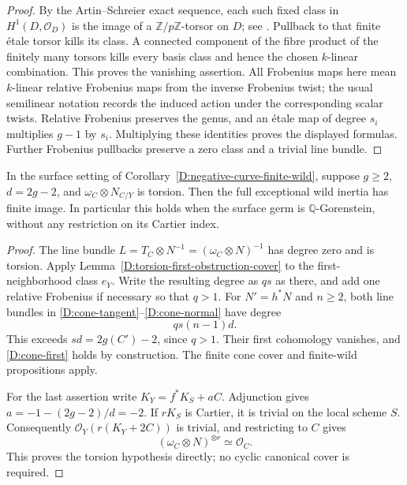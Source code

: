 \begin{proof}
By the Artin--Schreier exact sequence, each such fixed
class in $H^1(D,\mathcal O_D)$ is the image of a
$\mathbb Z/p\mathbb Z$-torsor on $D$; see
\cite[section 59.63, tag 0A3J]{StacksBFiniteCone}.
Pullback to that finite \'etale torsor kills its class.
A connected component of the fibre product of the
finitely many torsors kills every basis class and hence
the chosen $k$-linear combination.  This proves the
vanishing assertion.  All Frobenius maps here mean
$k$-linear relative Frobenius maps from the inverse
Frobenius twist; the usual semilinear notation records
the induced action under the corresponding scalar twists.
Relative Frobenius preserves the genus, and an \'etale
map of degree $s_i$ multiplies $g-1$ by $s_i$.
Multiplying these identities proves the displayed
formulas.  Further Frobenius pullbacks preserve a zero
class and a trivial line bundle.
\end{proof}

\begin{corollary}
\label{D:negative-curve-equality-finite-wild}
In the surface setting of
Corollary~\ref{D:negative-curve-finite-wild}, suppose $g\geq2$,
$d=2g-2$, and $\omega_C\otimes N_{C/Y}$ is torsion.
Then the full exceptional wild inertia has finite image.
In particular this holds when the surface germ is
$\mathbb Q$-Gorenstein, without any restriction on its
Cartier index.
\end{corollary}

\begin{proof}
The line bundle
$L=T_C\otimes N^{-1}=(\omega_C\otimes N)^{-1}$
has degree zero and is torsion.  Apply
Lemma~\ref{D:torsion-first-obstruction-cover} to the
first-neighborhood class $e_Y$.  Write the resulting
degree as $qs$ as there, and add one relative Frobenius
if necessary so that $q>1$.
For $N'=h^*N$ and $n\geq2$, both line bundles in
\eqref{D:cone-tangent}--\eqref{D:cone-normal} have degree
\[
                 qs(n-1)d.
\]
This exceeds $sd=2g(C')-2$, since $q>1$.
Their first cohomology vanishes, and
\eqref{D:cone-first} holds by construction.
The finite cone cover and finite-wild propositions apply.

For the last assertion write
$K_Y=f^*K_S+aC$.  Adjunction gives
$a=-1-(2g-2)/d=-2$.
If $rK_S$ is Cartier, it is trivial on the local scheme
$S$.  Consequently $\mathcal O_Y(r(K_Y+2C))$ is
trivial, and restricting to $C$ gives
\[
                    (\omega_C\otimes N)^{\otimes r}
                         \simeq\mathcal O_C.
\]
This proves the torsion hypothesis directly; no cyclic
canonical cover is required.
\end{proof}

